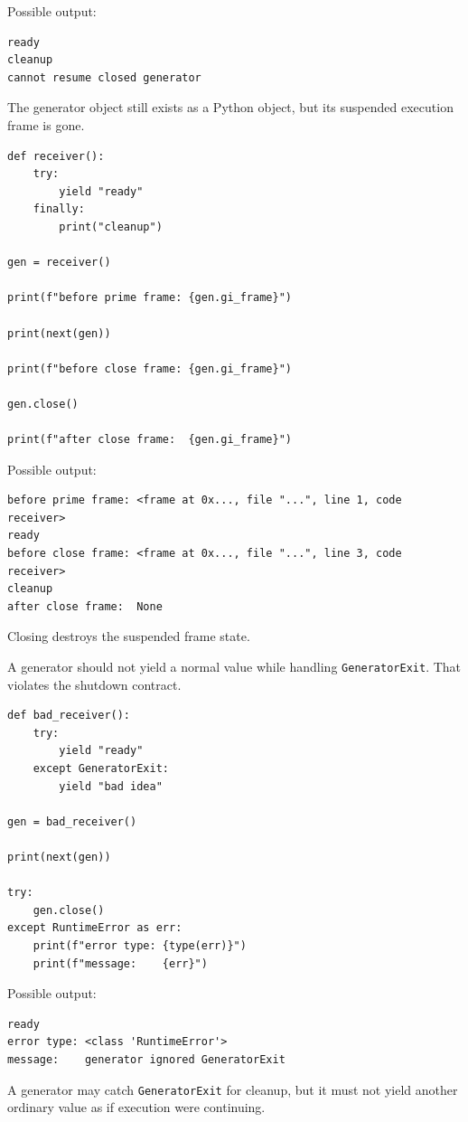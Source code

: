 Possible output:

\begin{verbatim}
ready
cleanup
cannot resume closed generator
\end{verbatim}

The generator object still exists as a Python object, but its suspended execution frame is gone.

\begin{verbatim}
def receiver():
    try:
        yield "ready"
    finally:
        print("cleanup")

gen = receiver()

print(f"before prime frame: {gen.gi_frame}")

print(next(gen))

print(f"before close frame: {gen.gi_frame}")

gen.close()

print(f"after close frame:  {gen.gi_frame}")
\end{verbatim}

Possible output:

\begin{verbatim}
before prime frame: <frame at 0x..., file "...", line 1, code receiver>
ready
before close frame: <frame at 0x..., file "...", line 3, code receiver>
cleanup
after close frame:  None
\end{verbatim}

Closing destroys the suspended frame state.

A generator should not yield a normal value while handling \texttt{GeneratorExit}. That violates the shutdown contract.

\begin{verbatim}
def bad_receiver():
    try:
        yield "ready"
    except GeneratorExit:
        yield "bad idea"

gen = bad_receiver()

print(next(gen))

try:
    gen.close()
except RuntimeError as err:
    print(f"error type: {type(err)}")
    print(f"message:    {err}")
\end{verbatim}

Possible output:

\begin{verbatim}
ready
error type: <class 'RuntimeError'>
message:    generator ignored GeneratorExit
\end{verbatim}

A generator may catch \texttt{GeneratorExit} for cleanup, but it must not yield another ordinary value as if execution were continuing.

